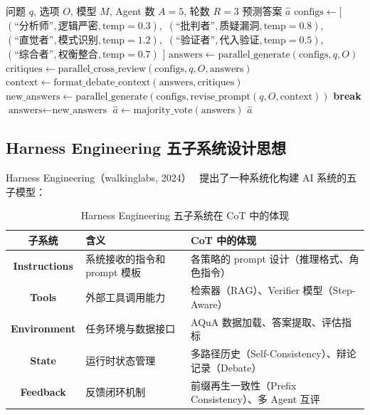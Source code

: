 \documentclass[lang=cn,a4paper,newtx]{elegantpaper}
\begin{document}
\begin{algorithm}[htbp]
\caption{Multi-Agent Debate（改进版）}
\begin{algorithmic}[1]
\Require 问题 $q$, 选项 $O$, 模型 $M$, Agent 数 $A=5$, 轮数 $R=3$
\Ensure 预测答案 $\hat{a}$
\State $\text{configs} \gets [$
\State \quad $(\text{``分析师''}, \text{逻辑严密}, \text{temp}=0.3),$
\State \quad $(\text{``批判者''}, \text{质疑漏洞}, \text{temp}=0.8),$
\State \quad $(\text{``直觉者''}, \text{模式识别}, \text{temp}=1.2),$
\State \quad $(\text{``验证者''}, \text{代入验证}, \text{temp}=0.5),$
\State \quad $(\text{``综合者''}, \text{权衡整合}, \text{temp}=0.7)$
\State $]$
\State $\text{answers} \gets \text{parallel\_generate}(\text{configs}, q, O)$ 
    \State $\text{critiques} \gets \text{parallel\_cross\_review}(\text{configs}, q, O, \text{answers})$ 
    \State $\text{context} \gets \text{format\_debate\_context}(\text{answers}, \text{critiques})$ 
    \State $\text{new\_answers} \gets \text{parallel\_generate}(\text{configs}, \text{revise\_prompt}(q, O, \text{context}))$ 
        \State \textbf{break} 
    \EndIf
    \State $\text{answers} \gets \text{new\_answers}$
\EndFor
\State $\hat{a} \gets \text{majority\_vote}(\text{answers})$ 
\State \Return $\hat{a}$
\end{algorithmic}
\end{algorithm}

\subsection{Harness Engineering 五子系统设计思想}

Harness Engineering（walkinglabs, 2024）~\cite{walkinglabs2024harness} 提出了一种系统化构建 AI 系统的五子模型：

\begin{table}[htbp]
\centering
\caption{Harness Engineering 五子系统在 CoT 中的体现}
\begin{tabular}{cp{4cm}p{6cm}}
\toprule
子系统 & 含义 & CoT 中的体现 \\
\midrule
\textbf{Instructions} & 系统接收的指令和 prompt 模板 & 各策略的 prompt 设计（推理格式、角色指令） \\
\textbf{Tools} & 外部工具调用能力 & 检索器（RAG）、Verifier 模型（Step-Aware） \\
\textbf{Environment} & 任务环境与数据接口 & AQuA 数据加载、答案提取、评估指标 \\
\textbf{State} & 运行时状态管理 & 多路径历史（Self-Consistency）、辩论记录（Debate） \\
\textbf{Feedback} & 反馈闭环机制 & 前缀再生一致性（Prefix Consistency）、多 Agent 互评 \\
\bottomrule
\end{tabular}
\end{table}
\end{document}
